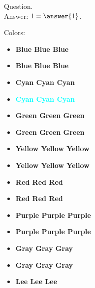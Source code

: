 \documentclass{ximera}
\author{Lee Wayand}
\begin{document}
\begin{exercise}

Question. \\
Answer: $ 1 = \answer{1}$.






Colors:


\begin{itemize}
\item \textbf{\textcolor[rgb]{0.266,0.466,0.666}{Blue Blue Blue}} \\
\item \textbf{\textcolor{blue!75!black}{Blue Blue Blue}} \\
\item \textbf{\textcolor[rgb]{0.4,0.8,0.933}{Cyan Cyan Cyan}} \\
\item \textbf{\textcolor{cyan}{Cyan Cyan Cyan}} \\
\item \textbf{\textcolor[rgb]{0.133,0.533,0.2}{Green Green Green}} \\
\item \textbf{\textcolor{green!50!black}{Green Green Green}} \\
\item \textbf{\textcolor[rgb]{0.8,0.733,0.266}{Yellow Yellow Yellow}} \\
\item \textbf{\textcolor{yellow!75!darkgray}{Yellow Yellow Yellow}} \\
\item \textbf{\textcolor[rgb]{0.933,0.4,0.466}{Red Red Red}} \\
\item \textbf{\textcolor{red!90!darkgray}{Red Red Red}} \\
\item \textbf{\textcolor[rgb]{0.666,0.2,0.466}{Purple Purple Purple}} \\
\item \textbf{\textcolor{purple!85!blue}{Purple Purple Purple}} \\
\item \textbf{\textcolor[rgb]{0.733,0.733,0.733}{Gray Gray Gray}} \\
\item \textbf{\textcolor{gray!90}{Gray Gray Gray}} \\
\item \textbf{\textcolor{leeColor}{Lee Lee Lee}}\\
\end{itemize}


\end{exercise}
\end{document}
